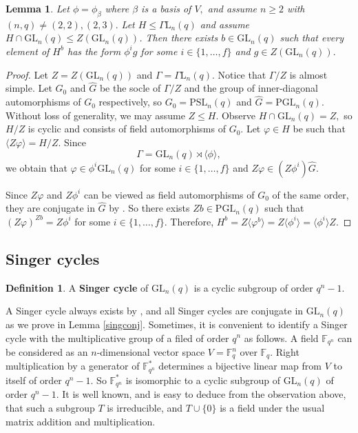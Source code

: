 \documentclass[a4paper,reqno,11pt]{amsart}
\newtheorem{Lem}[Th]{Lemma}
\theoremstyle{definition}
\newtheorem{Def}[Th]{Definition}
\theoremstyle{remark}
\numberwithin{equation}{section}
\newcommand{\GaL}{{\Gamma \mathrm{L}}}
\newcommand{\PSL}{{\mathrm{PSL}}}
\newcommand{\GL}{{\mathrm{GL}}}
\newcommand{\PGL}{{\mathrm{PGL}}}
\begin{document}
\begin{Lem}
\label{scfield}
Let  $\phi=\phi_{\beta}$ where $\beta$ is a basis of $V,$ and assume $n\ge 2$ with $(n,q) \ne (2,2),(2,3).$ Let $H \le \GaL_n(q) $ and assume  $H \cap \GL_n(q) \le Z(\GL_n(q))$. Then there exists $b \in \GL_n(q)$ such that every element of $H^b$ has the form $\phi^i g$ for some $i \in \{1, \ldots, f\}$ and $g \in Z(\GL_n(q)).$   
\end{Lem}
\begin{proof}
 Let $Z=Z(\GL_n(q))$ and $\Gamma=\GaL_n(q).$ Notice that $\Gamma/Z$ is almost simple. Let $G_0$ and $\hat{G}$ be the socle of $\Gamma/Z$ and the group of inner-diagonal automorphisms of $G_0$ respectively, so $G_0=\PSL_n(q)$ and $\hat{G}= \PGL_n(q).$ Without loss of generality, we may assume $Z \le H.$ Observe $H\cap \GL_n(q) = Z,$ so $H/Z$ is cyclic and consists of field automorphisms of $G_0.$ Let $\varphi \in H$ be such that $\langle Z \varphi \rangle=H/Z.$   Since 
$$\Gamma=\GL_n(q) \rtimes \langle \phi \rangle,$$
we obtain that $\varphi \in \phi^i  \GL_n(q)$ for some  $i \in \{1, \ldots, f\}$ and $Z\varphi \in (Z\phi^i) \hat{G}$.

 Since $Z \varphi$ and $Z \phi^i$ can be viewed as field automorphisms of $G_0$ of the same order, they are conjugate in $\hat{G}$ by \cite[(7-2)]{conjaut}. So   there exists  $Zb \in \PGL_n(q)$ such that $(Z\varphi)^{Zb}=Z\phi^i$ for some $i \in \{1, \ldots,  f\}.$  Therefore, $H^b = Z\langle \varphi^b \rangle = Z\langle \phi^i \rangle = \langle\phi^i \rangle Z.$
\end{proof}





\subsection{Singer cycles}\label{singsec}

\begin{Def}\label{sindef} A  {\bf Singer cycle}  of $\GL_n(q)$ is a cyclic subgroup of order $q^n - 1$.
\end{Def}

 A Singer cycle always exists by {\cite{singer38}}, and all Singer cycles are conjugate in $\GL_n(q)$ as we prove in Lemma \ref{singconj}. Sometimes, it is convenient to identify a Singer cycle with the multiplicative group of a filed of order $q^n$ as follows. A field $\mathbb{F}_{q^n}$ can be considered as an $n$-dimensional vector space $V=\mathbb{F}_q^n$ over $\mathbb{F}_q.$  Right multiplication by a generator of  $\mathbb{F}_{q^n}^*$ determines a bijective linear map from $V$ to itself of order $q^n-1$. So  $\mathbb{F}_{q^n}^*$  is isomorphic to a cyclic subgroup of $\GL_n(q)$ of order $q^n-1$. It is well known, and is easy to deduce from the observation above, that such a subgroup $T$ is irreducible, and $T \cup \{0\}$ is a field under the usual matrix addition and multiplication. 
\end{document}
